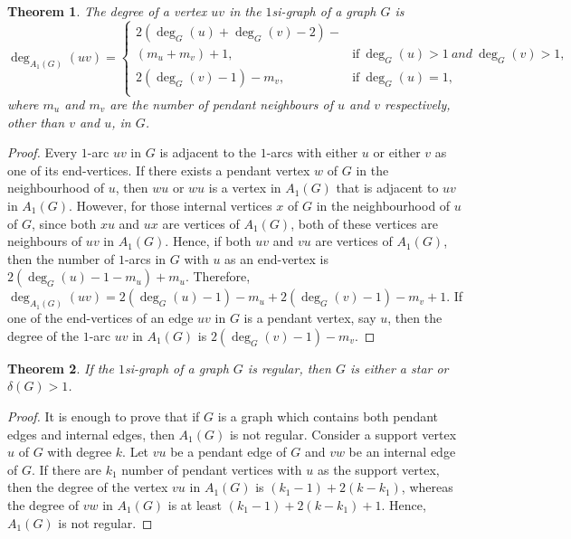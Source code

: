 \documentclass[12pt,a4paper,twoside]{article}
\newtheorem{theorem}{Theorem}[section]
\theoremstyle{casesty}
\theoremstyle{subcasesty}
\theoremstyle{schemesty}
\begin{document}
\begin{theorem} \label{A1deg1}
	The degree of a vertex $uv$ in the $1$si-graph of a graph $G$ is 
	\begin{equation*}
		\deg_{A_{1}(G)}(uv)=
		\begin{cases}
			2(\deg_{G}(u)+\deg_{G}(v)-2)-\\(m_{u}+m_{v})+1, & \mbox{if} \ {\deg_{G}(u)>1} \ {and} \ {\deg_{G}(v)>1},\\
			2(\deg_{G}(v)-1)-m_{v}, & \mbox{if} \ {\deg_{G}(u)=1},\\
		\end{cases}
	\end{equation*}
	where $m_{u}$ and $m_{v}$ are the number of pendant neighbours of $u$ and $v$ respectively, other than $v$ and $u$, in $G$.
\end{theorem}
\begin{proof}
	Every $1$-arc $uv$ in $G$ is adjacent to the $1$-arcs with either $u$ or either $v$ as one of its end-vertices. If there exists a pendant vertex $w$ of $G$ in the neighbourhood of $u$, then $wu$ or $wu$ is a vertex in $A_{1}(G)$ that is adjacent to $uv$ in $A_{1}(G)$. However, for those internal vertices $x$ of $G$ in the neighbourhood of $u$ of $G$, since both $xu$ and $ux$ are vertices of $A_{1}(G)$, both of these vertices are neighbours of $uv$ in $A_{1}(G)$. Hence, if both $uv$ and $vu$ are vertices of $A_{1}(G)$, then the number of $1$-arcs in $G$ with $u$ as an end-vertex is $2(\deg_{G}(u)-1-m_{u})+m_{u}$. Therefore, $\deg_{A_{1}(G)}(uv)=2(\deg_{G}(u)-1)-m_{u} + 2(\deg_{G}(v)-1)-m_{v} + 1$. If one of the end-vertices of an edge $uv$ in $G$ is a pendant vertex, say $u$, then the degree of the $1$-arc $uv$ in $A_{1}(G)$ is $2(\deg_{G}(v)-1)-m_{v}$.
\end{proof}

\begin{theorem}
	If the $1$si-graph of a graph $G$ is regular, then $G$ is either a star or $\delta(G)>1$.
\end{theorem}
\begin{proof}
	It is enough to prove that if $G$ is a graph which contains both pendant edges and internal edges, then $A_{1}(G)$ is not regular. Consider a support vertex $u$ of $G$ with degree $k$. Let $vu$ be a pendant edge of $G$ and $vw$ be an internal edge of $G$. If there are $k_{1}$ number of pendant vertices with $u$ as the support vertex, then the degree of the vertex $vu$ in $A_{1}(G)$ is $(k_{1}-1)+2(k-k_{1})$, whereas the degree of $vw$ in $A_{1}(G)$ is at least $(k_{1}-1)+2(k-k_{1})+1$. Hence, $A_{1}(G)$ is not regular.
\end{proof}
\end{document}
